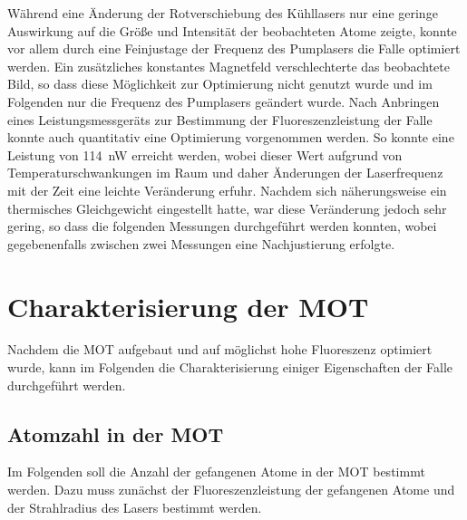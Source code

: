 \documentclass[11pt, a4paper]{article}
\numberwithin{equation}{section}
\begin{document}
Während eine Änderung der Rotverschiebung des Kühllasers nur eine geringe Auswirkung auf die Größe und Intensität der beobachteten Atome zeigte, konnte vor allem durch eine Feinjustage der Frequenz des Pumplasers die Falle optimiert werden.
Ein zusätzliches konstantes Magnetfeld verschlechterte das beobachtete Bild, so dass diese Möglichkeit zur Optimierung nicht genutzt wurde und im Folgenden nur die Frequenz des Pumplasers geändert wurde.
Nach Anbringen eines Leistungsmessgeräts zur Bestimmung der Fluoreszenzleistung der Falle konnte auch quantitativ eine Optimierung vorgenommen werden.
So konnte eine Leistung von \SI{114}{nW} erreicht werden, wobei dieser Wert aufgrund von Temperaturschwankungen im Raum und daher Änderungen der Laserfrequenz mit der Zeit eine leichte Veränderung erfuhr.
Nachdem sich näherungsweise ein thermisches Gleichgewicht eingestellt hatte, war diese Veränderung jedoch sehr gering, so dass die folgenden Messungen durchgeführt werden konnten, wobei gegebenenfalls zwischen zwei Messungen eine Nachjustierung erfolgte.

\section{Charakterisierung der MOT}
\label{sec:charakterisierung_mot}
Nachdem die MOT aufgebaut und auf möglichst hohe Fluoreszenz optimiert wurde, kann im Folgenden die Charakterisierung einiger Eigenschaften der Falle durchgeführt werden.

\subsection{Atomzahl in der MOT}
Im Folgenden soll die Anzahl der gefangenen Atome in der MOT bestimmt werden.
Dazu muss zunächst der Fluoreszenzleistung der gefangenen Atome und der Strahlradius des Lasers bestimmt werden.
\end{document}
